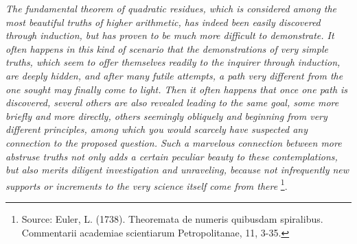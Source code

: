 \documentclass[twoside,12pt, showframe]{memoir}
\begin{document}
\textit{The fundamental theorem of quadratic residues, which is considered among the most beautiful truths of higher arithmetic, has indeed been easily discovered through induction, but has proven to be much more difficult to demonstrate. It often happens in this kind of scenario that the demonstrations of very simple truths, which seem to offer themselves readily to the inquirer through induction, are deeply hidden, and after many futile attempts, a path very different from the one sought may finally come to light. Then it often happens that once one path is discovered, several others are also revealed leading to the same goal, some more briefly and more directly, others seemingly obliquely and beginning from very different principles, among which you would scarcely have suspected any connection to the proposed question. Such a marvelous connection between more abstruse truths not only adds a certain peculiar beauty to these contemplations, but also merits diligent investigation and unraveling, because not infrequently new supports or increments to the very science itself come from there} \footnote{Source: Euler, L. (1738). Theoremata de numeris quibusdam spiralibus. Commentarii academiae scientiarum Petropolitanae, 11, 3-35.}.
%
\end{document}
